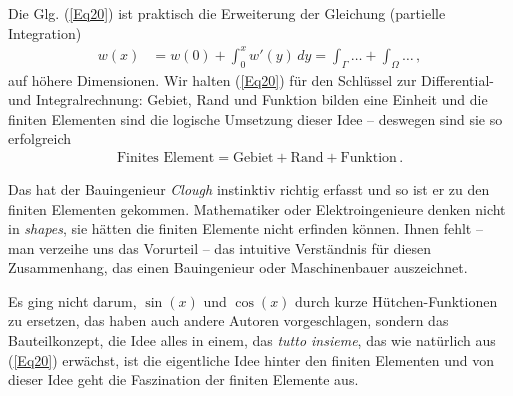 {\begin{remark}
Die Glg. (\ref{Eq20}) ist praktisch die Erweiterung der Gleichung (partielle Integration)
\begin{align}
w(x) &= w(0) + \int_{0}^{x} w'(y)\,dy = \int_{\Gamma} \ldots + \int_{\Omega} \ldots \,,
\end{align}
auf h\"{o}here Dimensionen. Wir halten (\ref{Eq20}) f\"{u}r den Schl\"{u}ssel zur Diffe\-ren\-tial- und Integralrechnung:  Gebiet, Rand und Funktion bilden eine Einheit und die finiten Elementen sind die logische Umsetzung dieser Idee -- deswegen sind sie so erfolgreich
\begin{align}
\text{Finites Element} = \text{Gebiet} + \text{Rand} + \text{Funktion}\,.
\end{align}
\end{remark}
Das hat der Bauingenieur {\em Clough\/} instinktiv richtig erfasst und so ist er zu den finiten Elementen gekommen. Mathematiker oder Elektroingenieure denken nicht in {\em shapes\/}, sie h\"{a}tten die finiten Elemente nicht erfinden k\"{o}nnen. Ihnen fehlt -- man verzeihe uns das Vorurteil -- das intuitive Verst\"{a}ndnis f\"{u}r diesen Zusammenhang, das einen Bauingenieur oder Maschinenbauer auszeichnet.

Es ging nicht darum, $\sin (x)$ und $\cos (x)$ durch kurze H\"{u}tchen-Funktionen zu ersetzen, das haben auch andere Autoren vorgeschlagen, sondern das Bauteilkonzept, die Idee alles in einem, das {\em tutto insieme\/}, das wie nat\"{u}rlich aus (\ref{Eq20}) erw\"{a}chst, ist die eigentliche Idee hinter den finiten Elementen und von dieser Idee geht die Faszination der finiten Elemente aus.} %


